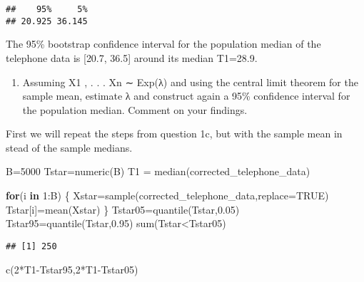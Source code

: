 \documentclass[
]{article}
\newenvironment{Shaded}{\begin{snugshade}}{\end{snugshade}}
\newcommand{\AttributeTok}[1]{\textcolor[rgb]{0.77,0.63,0.00}{#1}}
\newcommand{\ConstantTok}[1]{\textcolor[rgb]{0.00,0.00,0.00}{#1}}
\newcommand{\ControlFlowTok}[1]{\textcolor[rgb]{0.13,0.29,0.53}{\textbf{#1}}}
\newcommand{\DecValTok}[1]{\textcolor[rgb]{0.00,0.00,0.81}{#1}}
\newcommand{\FloatTok}[1]{\textcolor[rgb]{0.00,0.00,0.81}{#1}}
\newcommand{\FunctionTok}[1]{\textcolor[rgb]{0.00,0.00,0.00}{#1}}
\newcommand{\NormalTok}[1]{#1}
\newcommand{\OtherTok}[1]{\textcolor[rgb]{0.56,0.35,0.01}{#1}}
\newcommand{\SpecialCharTok}[1]{\textcolor[rgb]{0.00,0.00,0.00}{#1}}
\providecommand{\tightlist}{%
  \setlength{\itemsep}{0pt}\setlength{\parskip}{0pt}}
\begin{document}
\begin{verbatim}
##    95%     5% 
## 20.925 36.145
\end{verbatim}

The 95\% bootstrap confidence interval for the population median of the
telephone data is {[}20.7, 36.5{]} around its median T1=28.9.

\begin{enumerate}
\def\labelenumi{\alph{enumi})}
\setcounter{enumi}{3}
\tightlist
\item
  Assuming X1 , . . . Xn ∼ Exp(λ) and using the central limit theorem
  for the sample mean, estimate λ and construct again a 95\% confidence
  interval for the population median. Comment on your findings.
\end{enumerate}

First we will repeat the steps from question 1c, but with the sample
mean in stead of the sample medians.

\begin{Shaded}
\begin{Highlighting}[]
\NormalTok{B}\OtherTok{=}\DecValTok{5000}
\NormalTok{Tstar}\OtherTok{=}\FunctionTok{numeric}\NormalTok{(B)}
\NormalTok{T1 }\OtherTok{=} \FunctionTok{median}\NormalTok{(corrected\_telephone\_data)}

\ControlFlowTok{for}\NormalTok{(i }\ControlFlowTok{in} \DecValTok{1}\SpecialCharTok{:}\NormalTok{B) \{}
\NormalTok{  Xstar}\OtherTok{=}\FunctionTok{sample}\NormalTok{(corrected\_telephone\_data,}\AttributeTok{replace=}\ConstantTok{TRUE}\NormalTok{)}
\NormalTok{  Tstar[i]}\OtherTok{=}\FunctionTok{mean}\NormalTok{(Xstar) }
\NormalTok{  \}}
\NormalTok{Tstar05}\OtherTok{=}\FunctionTok{quantile}\NormalTok{(Tstar,}\FloatTok{0.05}\NormalTok{)}
\NormalTok{Tstar95}\OtherTok{=}\FunctionTok{quantile}\NormalTok{(Tstar,}\FloatTok{0.95}\NormalTok{)}
\FunctionTok{sum}\NormalTok{(Tstar}\SpecialCharTok{\textless{}}\NormalTok{Tstar05)}
\end{Highlighting}
\end{Shaded}

\begin{verbatim}
## [1] 250
\end{verbatim}

\begin{Shaded}
\begin{Highlighting}[]
\FunctionTok{c}\NormalTok{(}\DecValTok{2}\SpecialCharTok{*}\NormalTok{T1}\SpecialCharTok{{-}}\NormalTok{Tstar95,}\DecValTok{2}\SpecialCharTok{*}\NormalTok{T1}\SpecialCharTok{{-}}\NormalTok{Tstar05)}
\end{Highlighting}
\end{Shaded}
\end{document}
